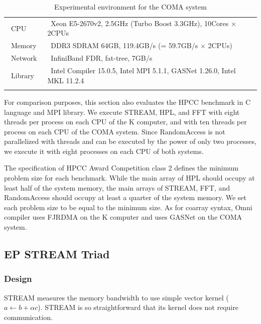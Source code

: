 \documentclass[graybox]{svmult}
\begin{document}
\begin{table}[h]
\caption{Experimental environment for the COMA system}\label{tab:spec-coma}
\begin{tabular}{l|l}
\hline\noalign{\smallskip}
~CPU~        & ~Xeon E5-2670v2, 2.5GHz  (Turbo Boost 3.3GHz), 10Cores $\times$ 2CPUs \\
~Memory~  & ~DDR3 SDRAM 64GB, 119.4GB/s (= 59.7GB/s $\times$ 2CPUs) \\
~Network~  & ~InfiniBand FDR, fat-tree, 7GB/s \\
~Library~    & ~Intel Compiler 15.0.5, Intel MPI 5.1.1, GASNet 1.26.0, Intel MKL 11.2.4\\
\noalign{\smallskip}\hline\noalign{\smallskip}
\end{tabular}
\end{table}

For comparison purposes, this section also evaluates the  HPCC benchmark in C language and MPI library. 
We execute STREAM, HPL, and FFT with eight threads per process on each CPU of the K computer, 
and with ten threads per process on each CPU of the COMA system. 
Since RandomAccess is not parallelized with threads and can be executed by the power of only two processes, 
we execute it with eight processes on each CPU of both systems.

The specification of HPCC Award Competition class 2 defines the minimum problem size for each benchmark. 
While the main array of HPL should occupy at least half of the system memory, 
the main arrays of STREAM, FFT, and RandomAccess should occupy at least a quarter of the system memory. 
We set each problem size to be equal to the minimum size.
As for coarray syntax, Omni compiler uses FJRDMA on the K computer and uses GASNet on the COMA system.
\subsection{EP STREAM Triad}
\subsubsection{Design}
STREAM measures the memory bandwidth to use simple vector kernel ({$a \leftarrow b + \alpha c$}).
STREAM is so straightforward that its kernel does not require communication.
\end{document}
